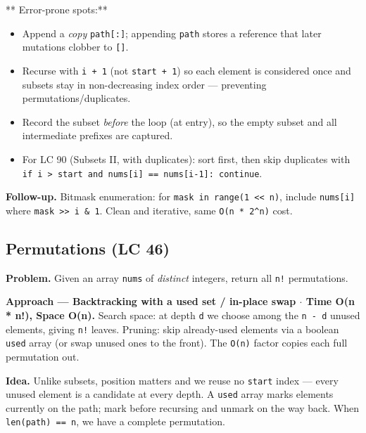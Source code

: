 \documentclass[11pt]{article}
\providecommand{\tightlist}{\setlength{\itemsep}{1pt}\setlength{\parskip}{0pt}}
\begin{document}
** Error-prone spots:**

\begin{itemize}
\tightlist
\item
  Append a \emph{copy} \texttt{path{[}:{]}}; appending \texttt{path} stores a reference that later mutations clobber to \texttt{{[}{]}}.
\item
  Recurse with \texttt{i\ +\ 1} (not \texttt{start\ +\ 1}) so each element is considered once and subsets stay in non-decreasing index order --- preventing permutations/duplicates.
\item
  Record the subset \emph{before} the loop (at entry), so the empty subset and all intermediate prefixes are captured.
\item
  For LC 90 (Subsets II, with duplicates): sort first, then skip duplicates with \texttt{if\ i\ \textgreater{}\ start\ and\ nums{[}i{]}\ ==\ nums{[}i-1{]}:\ continue}.
\end{itemize}

\textbf{Follow-up.} Bitmask enumeration: for \texttt{mask\ in\ range(1\ \textless{}\textless{}\ n)}, include \texttt{nums{[}i{]}} where \texttt{mask\ \textgreater{}\textgreater{}\ i\ \&\ 1}. Clean and iterative, same \texttt{O(n\ *\ 2\^{}n)} cost.

\subsection{Permutations (LC 46)}\label{permutations-lc-46}

\textbf{Problem.} Given an array \texttt{nums} of \emph{distinct} integers, return all \texttt{n!} permutations.

\textbf{Approach --- Backtracking with a used set / in-place swap \(\cdot\) Time O(n * n!), Space O(n).} Search space: at depth \texttt{d} we choose among the \texttt{n\ -\ d} unused elements, giving \texttt{n!} leaves. Pruning: skip already-used elements via a boolean \texttt{used} array (or swap unused ones to the front). The \texttt{O(n)} factor copies each full permutation out.

\textbf{Idea.} Unlike subsets, position matters and we reuse no \texttt{start} index --- every unused element is a candidate at every depth. A \texttt{used} array marks elements currently on the path; mark before recursing and unmark on the way back. When \texttt{len(path)\ ==\ n}, we have a complete permutation.

\end{document}
